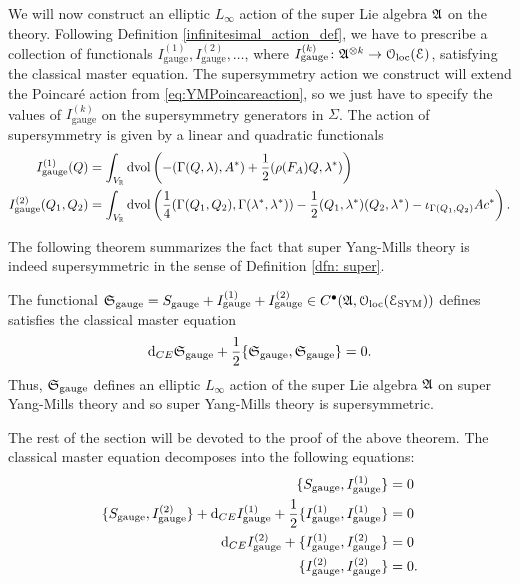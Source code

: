 \documentclass[10pt, oneside]{article}
\newcommand{\gauge}{\mathrm{gauge}}
\begin{document}
We will now construct an elliptic $L_\infty$ action of the super Lie algebra $\mathfrak{A}$ on the theory. 
Following Definition \ref{infinitesimal_action_def}, we have to prescribe a collection of functionals $I_{\gauge}^{(1)}, I_{\gauge}^{(2)}, \dots$, where $I_{\gauge}^{(k)}\colon \mf{A}^{\otimes k}\rightarrow \oloc(\cE)$, satisfying the classical master equation. The supersymmetry action we construct will extend the Poincar\'{e} action from \eqref{eq:YMPoincareaction}, so we just have to specify the values of $I_{\gauge}^{(k)}$ on the supersymmetry generators in $\Sigma$. The action of supersymmetry is given by a linear and quadratic functionals
\begin{align*}
I_{\gauge}^{(1)}(Q) &= \int_{V_\RR}\dvol\left( -(\Gamma(Q, \lambda), A^*) + \frac{1}{2}(\rho(F_A)Q, \lambda^*)\right) \\
I_{\gauge}^{(2)}(Q_1, Q_2) &= \int_{V_\RR}\dvol\left( \frac{1}{4}(\Gamma(Q_1, Q_2), \Gamma(\lambda^*, \lambda^*)) - \frac{1}{2}(Q_1, \lambda^*)(Q_2, \lambda^*) - \iota_{\Gamma(Q_1, Q_2)} A c^*\right).
\end{align*}

The following theorem summarizes the fact that super Yang-Mills theory is indeed supersymmetric in the sense of Definition \ref{dfn: super}. 

\begin{thm}\label{thm:gaugemultipletSUSY}
The functional $\fS_{\gauge} = S_{\gauge} + I_{\gauge}^{(1)} + I_{\gauge}^{(2)} \in C^\bu(\mf{A}, \oloc(\cE_{\rm SYM}))$ defines satisfies the classical master equation
\[\d_{CE} \fS_{\gauge} + \frac{1}{2}\{\fS_{\gauge}, \fS_{\gauge}\} = 0.\]
Thus, $\fS_{\gauge}$ defines an elliptic $L_\infty$ action of the super Lie algebra $\mathfrak A$ on super Yang-Mills theory and so super Yang-Mills theory is supersymmetric.  
\end{thm}

The rest of the section will be devoted to the proof of the above theorem. The classical master equation decomposes into the following equations:
\begin{align*}
\{S_{\gauge}, I_{\gauge}^{(1)}\} &= 0 \\
\{S_{\gauge}, I_{\gauge}^{(2)}\} + \d_{CE} I_{\gauge}^{(1)} + \frac{1}{2}\{I_{\gauge}^{(1)}, I_{\gauge}^{(1)}\} &= 0 \\
\d_{CE} I_{\gauge}^{(2)} + \{I_{\gauge}^{(1)}, I_{\gauge}^{(2)}\} &= 0 \\
\{I_{\gauge}^{(2)}, I_{\gauge}^{(2)}\} &= 0.
\end{align*}
\end{document}
